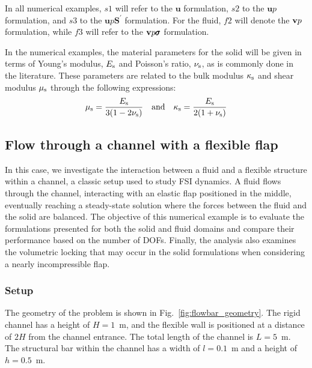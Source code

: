 \documentclass[11pt,english]{article}
\def\devPK{\pmb{S}^\prime}                      %
\def\u{{\pmb u}}                            %
\def\musolid{\mu_{\rm{s}}}              %
\def\nusolid{\nu_{\rm{s}}}              %
\def\Esolid{E_{\rm{s}}}                 %
\def\kappasolid{\kappa_{\rm{s}}}        %
\def\ups{\pmb{u} p \devPK}
\def\up{\pmb{u} p}
\def\vpsigma{\vb{v}p\pmb{\sigma}}
\def\vp{\vb{v}p}
\begin{document}
In all numerical examples, \( s1 \) will refer to the \( \u \) formulation, \( s2 \) to the \( \up \) formulation, and \( s3 \) to the \( \ups \) formulation. For the fluid, \( f2 \) will denote the \( \vp \) formulation, while \( f3 \) will refer to the \( \vpsigma \) formulation.

In the numerical examples, the material parameters for the solid will be given in terms of Young’s modulus, $\Esolid$ and Poisson’s ratio, $\nusolid$, as is commonly done in the literature. These parameters are related to the bulk modulus $\kappasolid$ and shear modulus $\musolid$ through the following expressions:
\begin{equation*}
    \musolid = \frac{\Esolid}{3(1-2\nusolid)} \quad \hbox{and} \quad \kappasolid = \frac{\Esolid}{2(1+\nusolid)}
\end{equation*}

\subsection{Flow through a channel with a flexible flap\label{subsec:flowbar}}

In this case, we investigate the interaction between a fluid and a flexible structure within a channel, a classic setup used to study FSI dynamics. A fluid flows through the channel, interacting with an elastic flap positioned in the middle, eventually reaching a steady-state solution where the forces between the fluid and the solid are balanced. The objective of this numerical example is to evaluate the formulations presented for both the solid and fluid domains and compare their performance based on the number of DOFs. Finally, the analysis also examines the volumetric locking that may occur in the solid formulations when considering a nearly incompressible flap. 

\subsubsection{Setup\label{subsubsec:flowbar_setup}}

The geometry of the problem is shown in Fig.~\ref{fig:flowbar_geometry}. The rigid channel has a height of \( H = 1 \)~m, and the flexible wall is positioned at a distance of \( 2H \) from the channel entrance. The total length of the channel is \( L = 5 \)~m. The structural bar within the channel has a width of \( l = 0.1 \)~m and a height of \( h = 0.5 \)~m.
\end{document}
